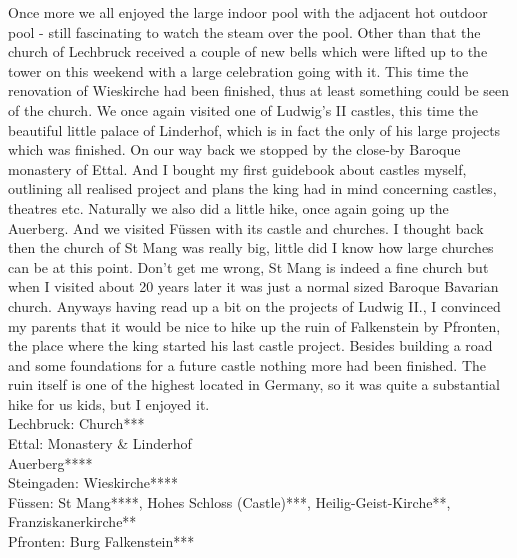 Once more we all enjoyed the large indoor pool with the adjacent hot outdoor pool - still fascinating to watch the steam over the pool. Other than that the church of Lechbruck received a couple of new bells which were lifted up to the tower on this weekend with a large celebration going with it. This time the renovation of Wieskirche had been finished, thus at least something could be seen of the church. We once again visited one of Ludwig's II castles, this time the beautiful little palace of Linderhof, which is in fact the only of his large projects which was finished. On our way back we stopped by the close-by Baroque monastery of Ettal. And I bought my first guidebook about castles myself, outlining all realised project and plans the king had in mind concerning castles, theatres etc. Naturally we also did a little hike, once again going up the Auerberg. And we visited F\"ussen with its castle and churches. I thought back then the church of St Mang was really big, little did I know how large churches can be at this point. Don't get me wrong, St Mang is indeed a fine church but when I visited about 20 years later it was just a normal sized Baroque Bavarian church. Anyways having read up a bit on the projects of Ludwig II., I convinced my parents that it would be nice to hike up the ruin of Falkenstein by Pfronten, the place where the king started his last castle project. Besides building a road and some foundations for a future castle nothing more had been finished. The ruin itself is one of the highest located in Germany, so it was quite a substantial hike for us kids, but I enjoyed it.\\

Lechbruck: Church***\\
Ettal: Monastery \& Linderhof\\
Auerberg****\\
Steingaden: Wieskirche****\\
F\"ussen: St Mang****, Hohes Schloss (Castle)***, Heilig-Geist-Kirche**, Franziskanerkirche**\\
Pfronten: Burg Falkenstein***\\

